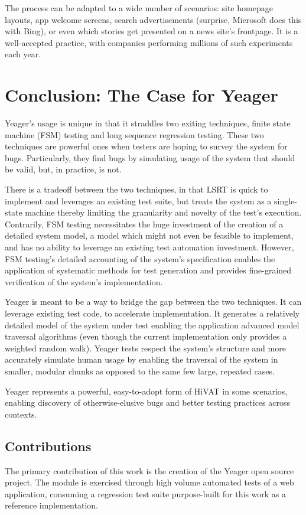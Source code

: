 The process can be adapted to a wide number of scenarios: site homepage layouts, app welcome screens, search advertisements (surprise, Microsoft does this with Bing), or even which stories get presented on a news site's frontpage. It is a well-accepted practice, with companies performing millions of such experiments each year. \citep{HBR2017ABTest}

\chapter{Conclusion: The Case for Yeager}
Yeager's usage is unique in that it straddles two exiting techniques, finite state machine (FSM) testing and long sequence regression testing. These two techniques are powerful ones when testers are hoping to survey the system for bugs. Particularly, they find bugs by simulating usage of the system that should be valid, but, in practice, is not.

There is a tradeoff between the two techniques, in that LSRT is quick to implement and leverages an existing test suite, but treats the system as a single-state machine thereby limiting the granularity and novelty of the test's execution. Contrarily, FSM testing necessitates the huge investment of the creation of a detailed system model, a model which might not even be feasible to implement, and has no ability to leverage an existing test automation investment. However, FSM testing's detailed accounting of the system's specification enables the application of systematic methods for test generation and provides fine-grained verification of the system's implementation.

Yeager is meant to be a way to bridge the gap between the two techniques. It can leverage existing test code, to accelerate implementation. It generates a relatively detailed model of the system under test enabling the application advanced model traversal algorithms (even though the current implementation only provides a weighted random walk). Yeager tests respect the system's structure and more accurately simulate human usage by enabling the traversal of the system in smaller, modular chunks as opposed to the same few large, repeated cases.

Yeager represents a powerful, easy-to-adopt form of HiVAT in some scenarios, enabling discovery of otherwise-elusive bugs and better testing practices across contexts.

\section{Contributions}
The primary contribution of this work is the creation of the Yeager open source project. The module is exercised through high volume automated tests of a web application, consuming a regression test suite purpose-built for this work as a reference implementation.

